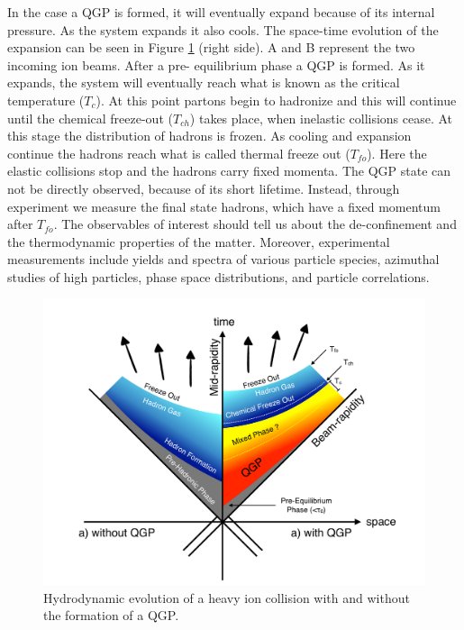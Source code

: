 In the case a QGP is formed, it will eventually expand because of its internal pressure. As the system expands it also cools. The space-time evolution of the expansion can be seen in Figure \ref{fig:freezeout} (right side). A and B represent the two incoming ion beams. After a pre- equilibrium phase a QGP is formed. As it expands, the system will eventually reach what is known as the critical temperature ($T_{c}$). At this point partons begin to hadronize and this will continue until the chemical freeze-out ($T_{ch}$) takes place, when inelastic collisions cease. At this stage the distribution of hadrons is frozen. As cooling and expansion continue the hadrons reach what is called thermal freeze out ($T_{fo}$). Here the elastic collisions stop and the hadrons carry fixed momenta. The QGP state can not be directly observed, because of its short lifetime. Instead, through experiment we measure the final state hadrons, which have a fixed momentum after $T_{fo}$. The observables of interest should tell us about the de-confinement and the thermodynamic properties of the matter. Moreover, experimental measurements include yields and \pt spectra of various particle species, azimuthal studies of high \pt particles, phase space distributions, and particle correlations.

\begin{figure}[htbp]
\begin{center}
\includegraphics[width=18.cm]{./Version1/FigChapter1/FreezeOut}
\caption{Hydrodynamic evolution of a heavy ion collision with and without the formation of a QGP. }
\label{fig:freezeout}
\end{center}
\end{figure}

